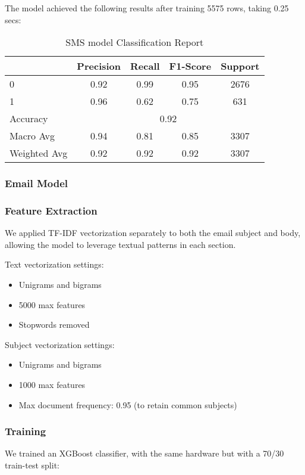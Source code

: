 \documentclass{article}
\begin{document}
The model achieved the following results after training 5575 rows, taking 0.25 secs:

\begin{table}[htbp]
    \centering
    \caption{SMS model Classification Report}
    \begin{tabular}{l c c c c}
    \toprule
     & Precision & Recall & F1-Score & Support \\
    \midrule
    0 & 0.92 & 0.99 & 0.95 & 2676 \\
    1 & 0.96 & 0.62 & 0.75 & 631 \\
    \midrule
    Accuracy & \multicolumn{4}{c}{0.92} \\
    Macro Avg & 0.94 & 0.81 & 0.85 & 3307 \\
    Weighted Avg & 0.92 & 0.92 & 0.92 & 3307 \\
    \bottomrule
    \end{tabular}
    \label{tab:classification_report_2}
\end{table}

\subsubsection{Email Model}
\subsubsection*{Feature Extraction}
We applied TF-IDF vectorization separately to both the email subject and body, allowing the model to leverage textual patterns in each section.

Text vectorization settings:
\begin{itemize}
    \item Unigrams and bigrams
    \item 5000 max features
    \item Stopwords removed
\end{itemize}

Subject vectorization settings:
\begin{itemize}
    \item Unigrams and bigrams
    \item 1000 max features
    \item Max document frequency: 0.95 (to retain common subjects)
\end{itemize}

\subsubsection*{Training}
We trained an XGBoost classifier, with the same hardware but with a 70/30 train-test split:
\end{document}
